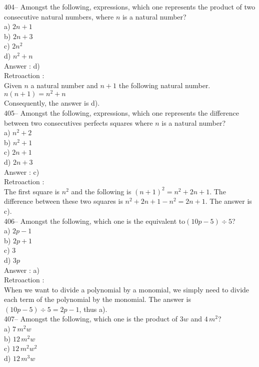 ﻿\documentclass[letterpaper, 12pt]{article}
\begin{document}
404-- Amongst the following, expressions, which one represents the product of two consecutive natural numbers, where $n$ is a natural number?\\
a) $2n+1$\\
b) $2n+3$ \\
c) $2n^{2}$\\
d) $n^{2}+n$\\

Answer : d)\\

Retroaction : \\
Given $n$ a natural number and $n+1$ the following natural number.\\
$n\left( n+1\right)=n^{2}+n$ \\
Consequently, the answer is d).\\

405-- Amongst the following, expressions, which one represents the difference between two consecutives perfects squares where $n$ is a natural number?\\
a) $n^{2}+2$\\
b) $n^{2}+1$\\
c) $2n+1$\\
d) $2n+3$\\

Answer : c)\\

Retroaction : \\
The first square is $n^{2}$ and the following is $\left( n+1\right)
^{2}=n^{2}+2n+1$.  The difference between these two squares is $n^{2}+2n+1-n^{2}=2n+1$. The answer is c).\\

406--  Amongst the following, which one is the equivalent to$\left(
10p-5\right) \div 5$?\\
a) $2p-1$\\
b) $2p+1$\\
c) 3\\
d) $3p$\\

Answer : a)\\

Retroaction : \\
When we want to divide a polynomial by a monomial, we simply need to divide each term of the polynomial by the monomial. The answer is $\left(
10p-5\right) \div 5=2p-1$, thus a).\\



407-- Amongst the following, which one is the product of $3w$ and
$4\,m^{2}$?\\
a) $7\,m^{2}w$\\
b) $12\,m^{2}w$ \\
c) $12\,m^{2}w^{2}$\\
d) $12\,m^{3}w$\\
\end{document}
